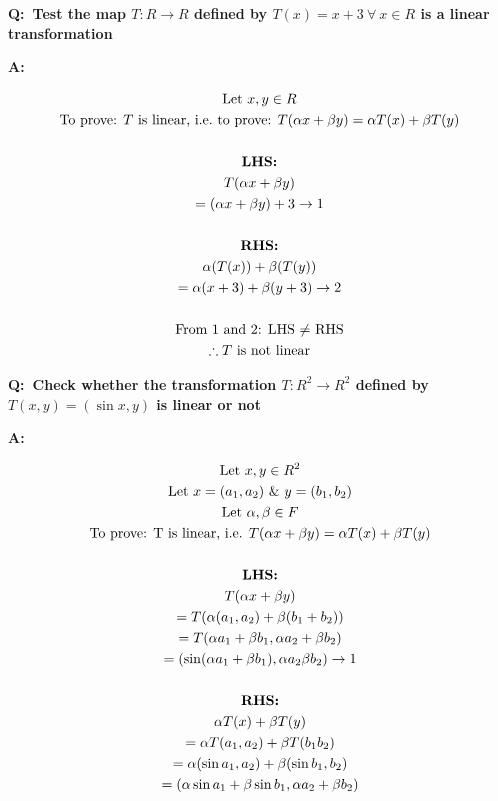 \documentclass[english,course,fleqn]{lecture}
\newenvironment{qanda}{\setlength{\parindent}{0pt}}{\bigskip}
\newcommand{\Q}{\bigskip\bfseries Q:\ }
\newcommand{\A}{\par\textbf{A:} \normalfont}
\begin{document}
\begin{qanda}
	\Q Test the map $T:R\rightarrow R$ defined by $T(x) = x + 3 ~\forall~ x \in R$ is a linear transformation

	\A

	\begin{gather*}
		\text{Let }x,y \in R\\
		\text{To prove: $T$ is linear, i.e.\ to prove: $T(\alpha x + \beta y) = \alpha T(x) + \beta T(y)$}\\
		\\
		\text{\textbf{LHS:}}\\
		T(\alpha x + \beta y )\\
		= (\alpha x + \beta y) + 3 \rightarrow 1\\
		\\
		\text{\textbf{RHS:}}\\
		\alpha (T(x)) + \beta (T(y))\\
		= \alpha (x + 3) + \beta ( y + 3) \rightarrow 2\\
		\\
		\text{From $1$ and $2$: LHS $\ne$ RHS}\\
		\therefore \text{$T$ is not linear}
	\end{gather*}

	\Q Check whether the transformation $T:R^{2} \rightarrow R^{2}$ defined by $T(x,y) = (\sin x, y)$ is linear or not

	\A

	\begin{gather*}
		\text{Let $x,y \in R^{2}$}\\
		\text{Let $x = (a_{1}, a_{2})$ \& $y = (b_{1}, b_{2})$}\\
		\text{Let $\alpha, \beta \in F$}\\
		\text{To prove: T is linear, i.e. $T(\alpha x + \beta y) = \alpha T(x) + \beta T(y)$}\\
		\\
		\text{\textbf{LHS:}}\\
		T(\alpha x + \beta y)\\
		= T(\alpha (a_{1}, a_{2}) + \beta(b_{1} + b_{2}))\\
		= T(\alpha a_{1} + \beta b_{1}, \alpha a_{2} + \beta b_{2})\\
		= (\sin (\alpha a_{1} + \beta b_{1}), \alpha a_{2} \beta b_{2}) \rightarrow 1\\
		\\
		\text{\textbf{RHS:}}\\
		\alpha T(x) + \beta T(y)\\
		= \alpha T(a_{1}, a_{2}) + \beta T(b_{1} b_{2})\\
		= \alpha (\sin a_{1}, a_{2}) + \beta (\sin b_{1}, b_{2})\\
		= (\alpha \sin a_{1} + \beta \sin b_{1}, \alpha a_{2} + \beta b_{2})\\
	\end{gather*}


\end{qanda}
\end{document}
